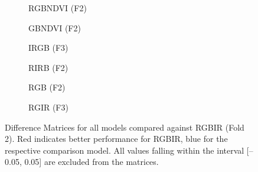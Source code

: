 \begin{figure}[htbp]
    \centering
    \begin{subfigure}{0.48\textwidth}
        \centering
        
        \caption{RGBNDVI (F2)}
        \label{fig:perm_exp_diffM_rgbndvi_f2}
    \end{subfigure}
    \begin{subfigure}{0.48\textwidth}
        \centering
        
        \caption{GBNDVI (F2)}
        \label{fig:perm_exp_diffM_gbndvi_f2}
    \end{subfigure}
    
    \begin{subfigure}{0.48\textwidth}
        \centering
        
        \caption{IRGB (F3)}
        \label{fig:perm_exp_diffM_irgb_f3}
    \end{subfigure}
    \begin{subfigure}{0.48\textwidth}
        \centering
        
        \caption{RIRB (F2)}
        \label{fig:perm_exp_diffM_RIRB_f2}
    \end{subfigure}
    
    \begin{subfigure}{0.48\textwidth}
        \centering
        
        \caption{RGB (F2)}
        \label{fig:perm_exp_diffM_RGB_f2}
    \end{subfigure}
    \begin{subfigure}{0.48\textwidth}
        \centering
        
        \caption{RGIR (F3)}
        \label{fig:perm_exp_diffM_RGIR_f3}
    \end{subfigure}

    \caption[Difference Matrices compared to RGBIR (Fold 2)]{Difference Matrices for all models compared against RGBIR (Fold 2). Red indicates better performance for RGBIR, blue for the respective comparison model. All values falling within the interval [–0.05, 0.05] are excluded from the matrices.}
    \label{fig:perm_exp_diffM_all}
\end{figure}

